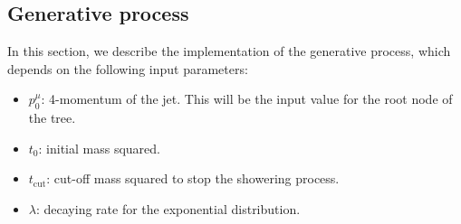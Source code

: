 \documentclass[12pt]{article}
\begin{document}
\subsection{Generative process}\label{Generatiion}

In this section, we describe the implementation of the generative process, which depends on the following input parameters:
\begin{itemize}

\item $p_0^\mu$: 4-momentum of the jet. This will be the input value for the root node of the tree.
\item $t_0$: initial mass squared. 
\item $t_\text{cut}$: cut-off mass squared to stop the showering process. 
\item $\lambda$: decaying rate for the exponential distribution.

\end{itemize}
\end{document}
